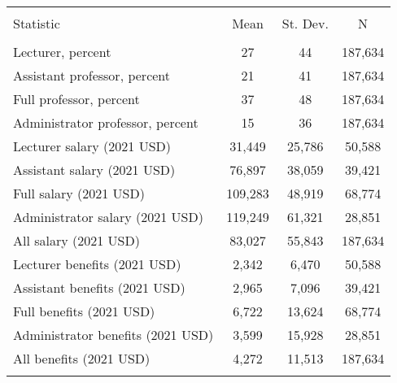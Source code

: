 
\begin{tabular}{@{\extracolsep{5pt}}lccc} 
\\[-1.8ex]\hline 
\hline \\[-1.8ex] 
Statistic & \multicolumn{1}{c}{Mean} & \multicolumn{1}{c}{St. Dev.} & \multicolumn{1}{c}{N} \\ 
\hline \\[-1.8ex] 
Lecturer, percent & 27 & 44 & 187,634 \\ 
Assistant professor, percent & 21 & 41 & 187,634 \\ 
Full professor, percent & 37 & 48 & 187,634 \\ 
Administrator professor, percent & 15 & 36 & 187,634 \\ 
Lecturer salary (2021 USD) & 31,449 & 25,786 & 50,588 \\ 
Assistant salary (2021 USD) & 76,897 & 38,059 & 39,421 \\ 
Full salary (2021 USD) & 109,283 & 48,919 & 68,774 \\ 
Administrator salary (2021 USD) & 119,249 & 61,321 & 28,851 \\ 
All salary (2021 USD) & 83,027 & 55,843 & 187,634 \\ 
Lecturer benefits (2021 USD) & 2,342 & 6,470 & 50,588 \\ 
Assistant benefits (2021 USD) & 2,965 & 7,096 & 39,421 \\ 
Full benefits (2021 USD) & 6,722 & 13,624 & 68,774 \\ 
Administrator benefits (2021 USD) & 3,599 & 15,928 & 28,851 \\ 
All benefits (2021 USD) & 4,272 & 11,513 & 187,634 \\ 
\hline \\[-1.8ex] 
\end{tabular} 

